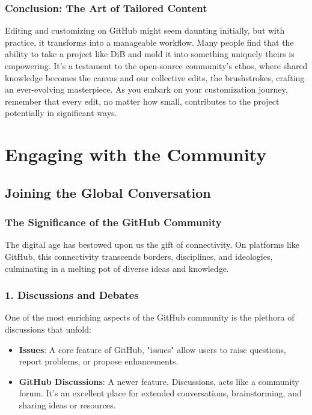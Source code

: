 \documentclass{book}
\begin{document}
\subsection*{Conclusion: The Art of Tailored Content}
Editing and customizing on GitHub might seem daunting initially, but with practice, it transforms into a manageable workflow. Many people find that the ability to take a project like DiB and mold it into something uniquely theirs is empowering. It's a testament to the open-source community's ethos, where shared knowledge becomes the canvas and our collective edits, the brushstrokes, crafting an ever-evolving masterpiece. As you embark on your customization journey, remember that every edit, no matter how small, contributes to the project potentially in significant ways.

\chapter{Engaging with the Community}
\section*{Joining the Global Conversation}

\subsection*{The Significance of the GitHub Community}
The digital age has bestowed upon us the gift of connectivity. On platforms like GitHub, this connectivity transcends borders, disciplines, and ideologies, culminating in a melting pot of diverse ideas and knowledge. 

\subsection*{1. Discussions and Debates}
One of the most enriching aspects of the GitHub community is the plethora of discussions that unfold:

\begin{itemize}
    \item \textbf{Issues}: A core feature of GitHub, "issues" allow users to raise questions, report problems, or propose enhancements. 
    \item \textbf{GitHub Discussions}: A newer feature, Discussions, acts like a community forum. It's an excellent place for extended conversations, brainstorming, and sharing ideas or resources.
\end{itemize}
\end{document}
